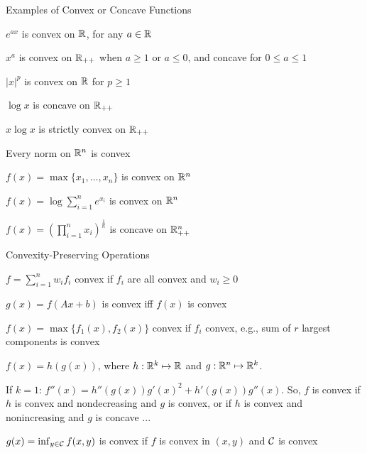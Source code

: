 \documentclass[handout,fleqn,aspectratio=169]{beamer}
\begin{document}

\begin{frame}{Examples of Convex or Concave Functions}

\plitemsep 0.1in

\bci 

\item $e^{ax}$ is convex on ${\mathbb R}$, for any $a\in{\mathbb R}$

\item $x^{a}$ is convex on ${\mathbb R}_{++}$ when $a\geq 1$ or
$a\leq 0$, and concave for $0\leq a\leq 1$

\item $|x|^{p}$ is convex on ${\mathbb R}$ for $p\geq 1$

\item $\log x$ is concave on ${\mathbb R}_{++}$

\item $x\log x$ is strictly convex on ${\mathbb R}_{++}$

\item Every norm on ${\mathbb R}^{n}$ is convex

\item $f(x)=\max\{x_{1},\ldots,x_{n}\}$ is convex on
${\mathbb R}^{n}$

\item $f(x)=\log\sum_{i=1}^{n}e^{x_{i}}$ is convex on
${\mathbb R}^{n}$

\item $f(x)=\left(\prod_{i=1}^{n}x_{i}\right)^{\frac{1}{n}}$
is concave on ${\mathbb R}_{++}^{n}$

\eci
\end{frame}



\begin{frame}{Convexity-Preserving Operations}

\plitemsep 0.1in

\bci 

\item $f=\sum_{i=1}^{n}w_{i}f_{i}$ convex if $f_{i}$ are all
convex and $w_{i}\geq 0$

\item $g(x)=f(Ax+b)$ is convex iff $f(x)$ is convex

\item $f(x)=\max\{f_{1}(x),f_{2}(x)\}$ convex if $f_{i}$
convex, e.g., sum of $r$ largest components is convex

\item $f(x)=h(g(x))$, where $h:{\mathbb R}^{k} \mapsto {\mathbb R}$
and $g:{\mathbb R}^{n} \mapsto {\mathbb R}^{k}$.

\medskip
If $k=1$: $f''(x) = h''(g(x))g'(x)^{2} + h'(g(x))g''(x)$. So,
$f$ is convex if $h$ is convex and nondecreasing and $g$ is
convex, or if $h$ is convex and nonincreasing and $g$ is concave
...

\item $g(x)=\inf_{y\in \mathcal C} f(x,y)$ is convex if $f$ is convex in $(x,y)$
and $\mathcal C$ is convex

\eci
\end{frame}
\end{document}
